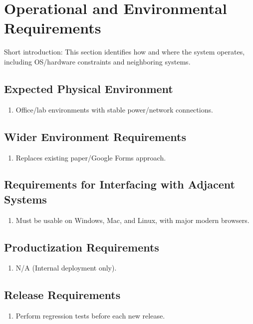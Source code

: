 \documentclass[12pt]{article}
\begin{document}
\section{Operational and Environmental Requirements}
Short introduction: This section identifies how and where the system operates, including OS/hardware constraints and neighboring systems.

\subsection{Expected Physical Environment}
\begin{enumerate}
  \item Office/lab environments with stable power/network connections.
\end{enumerate}

\subsection{Wider Environment Requirements}
\begin{enumerate}
  \item Replaces existing paper/Google Forms approach.
\end{enumerate}

\subsection{Requirements for Interfacing with Adjacent Systems}
\begin{enumerate}
  \item Must be usable on Windows, Mac, and Linux, with major modern browsers.
\end{enumerate}

\subsection{Productization Requirements}
\begin{enumerate}
  \item N/A (Internal deployment only).
\end{enumerate}

\subsection{Release Requirements}
\begin{enumerate}
  \item Perform regression tests before each new release.
\end{enumerate}
\end{document}
